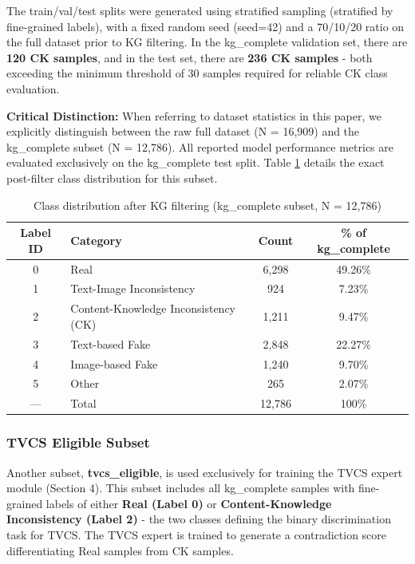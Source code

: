 The train/val/test splits were generated using stratified sampling (stratified by fine-grained labels), with a fixed random seed (seed=42) and a 70/10/20 ratio on the full dataset prior to KG filtering. In the kg\_complete validation set, there are \textbf{120 CK samples}, and in the test set, there are \textbf{236 CK samples} - both exceeding the minimum threshold of 30 samples required for reliable CK class evaluation.

\textbf{Critical Distinction:} When referring to dataset statistics in this paper, we explicitly distinguish between the raw full dataset (N = 16,909) and the kg\_complete subset (N = 12,786). All reported model performance metrics are evaluated exclusively on the kg\_complete test split. Table \ref{tab:kg_complete_dist} details the exact post-filter class distribution for this subset.

\begin{table}[!t]
\centering
\caption{Class distribution after KG filtering (kg\_complete subset, N = 12,786)}
\label{tab:kg_complete_dist}
\begin{tabularx}{\textwidth}{|c|X|c|c|}
\hline
\textbf{Label ID} & \textbf{Category} & \textbf{Count} & \textbf{\% of kg\_complete} \\
\hline
0 & Real & 6,298 & 49.26\% \\
\hline
1 & Text-Image Inconsistency & 924 & 7.23\% \\
\hline
2 & Content-Knowledge Inconsistency (CK) & 1,211 & 9.47\% \\
\hline
3 & Text-based Fake & 2,848 & 22.27\% \\
\hline
4 & Image-based Fake & 1,240 & 9.70\% \\
\hline
5 & Other & 265 & 2.07\% \\
\hline
— & Total & 12,786 & 100\% \\
\hline
\end{tabularx}
\end{table}

\subsubsection{TVCS Eligible Subset}
Another subset, \textbf{tvcs\_eligible}, is used exclusively for training the TVCS expert module (Section 4). This subset includes all kg\_complete samples with fine-grained labels of either \textbf{Real (Label 0)} or \textbf{Content-Knowledge Inconsistency (Label 2)} - the two classes defining the binary discrimination task for TVCS. The TVCS expert is trained to generate a contradiction score differentiating Real samples from CK samples.

